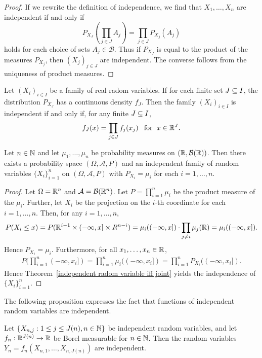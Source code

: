 \begin{proof}
If we rewrite the definition of independence, we find that $X_1,\dots,X_n$ are independent if and only if
\[P_{X_J}(\prod_{j\in J}A_j)=\prod_{j\in J}P_{X_j}(A_j)\]
holds for each choice of sets $A_j\in\mathcal{B}$. Thus if $P_{X_J}$ is equal to the product of the measures $P_{X_j}$, then $(X_j)_{j\in J}$ are independent. The converse follows from the uniqueness of product measures.
\end{proof}
\begin{corollary}
Let $(X_i)_{i\in I}$ be a family of real radom variables. If for each finite set $J\subseteq I$, the distribution $P_{X_J}$ has a continuous density $f_J$. Then the family $(X_i)_{i\in I}$ is independent if and only if, for any finite $J\subseteq I$,
\[f_J(x)=\prod_{j\in J}f_j(x_j)\hspace{8pt}\text{for}\hspace{6pt} x\in\mathbb{R}^J.\]
\end{corollary}
\begin{corollary}
Let $n\in\mathbb{N}$ and let $\mu_1,\dots,\mu_n$ be probability measures on $(\mathbb{R},\mathcal{B}(\mathbb{R}))$. Then there exists a probability space $(\Omega,\mathcal{A},P)$ and an independent family of random variables $\{X_i\}_{i=1}^{n}$ on $(\Omega,\mathcal{A},P)$ with $P_{X_i}=\mu_i$ for each $i=1,\dots,n$.
\end{corollary}
\begin{proof}
Let $\Omega=\mathbb{R}^n$ and $\mathcal{A}=\mathcal{B}(\mathbb{R}^n)$. Let $P=\prod_{i=1}^{n}\mu_i$ be the product measure of the $\mu_i$. Further, let $X_i$ be the projection on the $i$-th coordinate for each $i=1,\dots,n$. Then, for any $i=1,\dots,n$,
\begin{align*}
P(X_i\leq x)=P(\mathbb{R}^{i-1}\times(-\infty,x]\times R^{n-i})=\mu_i((-\infty,x])\cdot\prod_{j\neq i}\mu_j(\mathbb{R})=\mu_i((-\infty,x]).
\end{align*}
Hence $P_{X_i}=\mu_i$. Furthermore, for all $x_1,\dots,x_n\in\mathbb{R}$,
\begin{align*}
P(\prod_{i=1}^{n}(-\infty,x_i])=\prod_{i=1}^{n}\mu_i((-\infty,x_i])=\prod_{i=1}^{n}P_{X_i}((-\infty,x_i]).
\end{align*}
Hence Theorem~\ref{independent radom variable iff joint} yields the independence of $\{X_i\}_{i=1}^{n}$.
\end{proof}
The following proposition expresses the fact that functions of independent random variables are independent.
\begin{proposition}
Let $\{X_{n,j}:1\leq j\leq J(n),n\in\mathbb{N}\}$ be independent random variables, and let $f_n:\mathbb{R}^{J(n)}\to\mathbb{R}$ be Borel measurable for $n\in\mathbb{N}$. Then the random variables $Y_n=f_n(X_{n,1},\dots,X_{n,J(n)})$ are independent.
\end{proposition}
